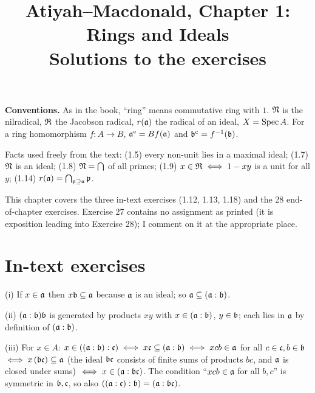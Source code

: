 \documentclass[11pt]{article}
\title{Atiyah--Macdonald, Chapter 1: Rings and Ideals\\[2pt]\large Solutions to the exercises}
\author{}
\date{}
\begin{document}
\maketitle
\noindent\textbf{Conventions.} As in the book, ``ring'' means commutative ring with $1$. $\mathfrak N$ is the nilradical, $\mathfrak R$ the Jacobson radical, $r(\mathfrak a)$ the radical of an ideal, $X=\operatorname{Spec} A$. For a ring homomorphism $f:A\to B$, $\mathfrak a^{\mathrm{e}}=Bf(\mathfrak a)$ and $\mathfrak b^{\mathrm{c}}=f^{-1}(\mathfrak b)$.

Facts used freely from the text: (1.5) every non-unit lies in a maximal ideal; (1.7) $\mathfrak N$ is an ideal; (1.8) $\mathfrak N=\bigcap$ of all primes; (1.9) $x\in\mathfrak R\iff 1-xy$ is a unit for all $y$; (1.14) $r(\mathfrak a)=\bigcap_{\mathfrak p\supseteq\mathfrak a}\mathfrak p$.

This chapter covers the three in-text exercises (1.12, 1.13, 1.18) and the 28 end-of-chapter exercises. Exercise 27 contains no assignment as printed (it is exposition leading into Exercise 28); I comment on it at the appropriate place.

\section*{In-text exercises}

\pf
(i) If $x\in\mathfrak a$ then $x\mathfrak b\subseteq\mathfrak a$ because $\mathfrak a$ is an ideal; so $\mathfrak a\subseteq(\mathfrak a:\mathfrak b)$.

(ii) $(\mathfrak a:\mathfrak b)\mathfrak b$ is generated by products $xy$ with $x\in(\mathfrak a:\mathfrak b)$, $y\in\mathfrak b$; each lies in $\mathfrak a$ by definition of $(\mathfrak a:\mathfrak b)$.

(iii) For $x\in A$:
$x\in((\mathfrak a:\mathfrak b):\mathfrak c)\iff x\mathfrak c\subseteq(\mathfrak a:\mathfrak b)\iff xcb\in\mathfrak a$ for all $c\in\mathfrak c,b\in\mathfrak b$ $\iff x\,(\mathfrak b\mathfrak c)\subseteq\mathfrak a$ (the ideal $\mathfrak b\mathfrak c$ consists of finite sums of products $bc$, and $\mathfrak a$ is closed under sums) $\iff x\in(\mathfrak a:\mathfrak b\mathfrak c)$. The condition ``$xcb\in\mathfrak a$ for all $b,c$'' is symmetric in $\mathfrak b,\mathfrak c$, so also $((\mathfrak a:\mathfrak c):\mathfrak b)=(\mathfrak a:\mathfrak b\mathfrak c)$.
\end{document}
